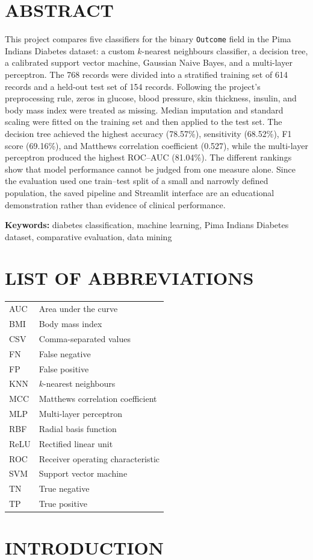 \documentclass[pdflatex,sn-vancouver-num]{sn-jnl}
\newcommand{\reportabstract}{This project compares five classifiers for the binary \texttt{Outcome} field in the Pima Indians Diabetes dataset: a custom $k$-nearest neighbours classifier, a decision tree, a calibrated support vector machine, Gaussian Naive Bayes, and a multi-layer perceptron. The 768 records were divided into a stratified training set of 614 records and a held-out test set of 154 records. Following the project's preprocessing rule, zeros in glucose, blood pressure, skin thickness, insulin, and body mass index were treated as missing. Median imputation and standard scaling were fitted on the training set and then applied to the test set. The decision tree achieved the highest accuracy (78.57\%), sensitivity (68.52\%), F1 score (69.16\%), and Matthews correlation coefficient (0.527), while the multi-layer perceptron produced the highest ROC--AUC (81.04\%). The different rankings show that model performance cannot be judged from one measure alone. Since the evaluation used one train--test split of a small and narrowly defined population, the saved pipeline and Streamlit interface are an educational demonstration rather than evidence of clinical performance.}
\newcommand{\reportkeywords}{diabetes classification, machine learning, Pima Indians Diabetes dataset, comparative evaluation, data mining}
\begin{document}
\setcounter{page}{1}
\pagestyle{plain}

\section*{ABSTRACT}
{}
\noindent\reportabstract\par
\vspace{0.5cm}
\noindent\textbf{Keywords:} \reportkeywords\par

\clearpage
\renewcommand{\contentsname}{TABLE OF CONTENTS}
\tableofcontents

\clearpage
{}
{}
\section*{LIST OF ABBREVIATIONS}
\vspace{0.5cm}
\begin{center}
\renewcommand{\arraystretch}{1.25}
\begin{tabular}{@{}p{}p{}@{}}
AUC & Area under the curve \\
BMI & Body mass index \\
CSV & Comma-separated values \\
FN & False negative \\
FP & False positive \\
KNN & $k$-nearest neighbours \\
MCC & Matthews correlation coefficient \\
MLP & Multi-layer perceptron \\
RBF & Radial basis function \\
ReLU & Rectified linear unit \\
ROC & Receiver operating characteristic \\
SVM & Support vector machine \\
TN & True negative \\
TP & True positive \\
\end{tabular}
\end{center}

\clearpage
{}
\setcounter{page}{1}

\section{INTRODUCTION}\label{sec:introduction}
\end{document}
